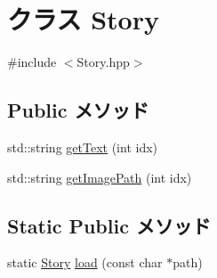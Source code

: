 \hypertarget{class_story}{\section{クラス Story}
\label{class_story}
}


{\ttfamily \#include $<$Story.\-hpp$>$}

\subsection*{Public メソッド}
\begin{DoxyCompactItemize}
\item 
std\-::string \hyperlink{class_story_aad0be22d7fb9e20aa06eb671fac6a2e9}{get\-Text} (int idx)
\item 
std\-::string \hyperlink{class_story_a7ec46e72ac2dd44451178781f6b78ef2}{get\-Image\-Path} (int idx)
\end{DoxyCompactItemize}
\subsection*{Static Public メソッド}
\begin{DoxyCompactItemize}
\item 
static \hyperlink{class_story}{Story} \hyperlink{class_story_a5d9613a28e0888cd74a5e309c4d3ffbf}{load} (const char $\ast$path)
\end{DoxyCompactItemize}


